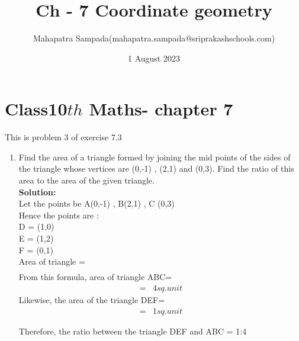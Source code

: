 \documentclass{article}
\title{Ch - 7 Coordinate geometry}
\author{Mahapatra Sampada(mahapatra.sampada@sriprakashschools.com)}
\date{1 August 2023}
\newcommand{\solution}{\noindent \textbf{Solution: }}
\begin{document}
\maketitle
\section*{Class10${th}$ Maths- chapter 7}
This is problem 3 of exercise 7.3
\begin{enumerate}
\item Find the area of a triangle formed by joining the mid points of the sides of the triangle whose vertices are (0,-1) , (2,1) and (0,3). Find the ratio of this area to the area of the given triangle. \\

\solution\\
Let the points be A(0,-1) , B(2,1) , C (0,3)\\ 
Hence the points are :\\
D = (1,0)\\
E = (1,2)\\
F = (0,1)\\
    Area of triangle = 
\begin{align}
    [\frac{1}{2}][\lvert x_1(y_2 - y_3)+x_2(y_3 - y_1)+x_3(y_1 - y_2)\rvert]
\end{align}
From this formula, area of triangle ABC=
 \begin{align}
 [\frac{1}{2}] [\lvert  0(1-3)+ 2(3+1)+ 0(-1-1)\rvert] =&
 4sq.unit
 \end{align}
Likewise, the area of the triangle DEF= 
 \begin{align}
 [\frac{1}{2}] [\lvert  1(2-1)+ 1(1-0)+ 0(0-2)\rvert] =&
1 sq.unit
 \end{align}
 
 Therefore, the ratio between the triangle DEF and ABC = 1:4
\end{enumerate}
\end{document}
